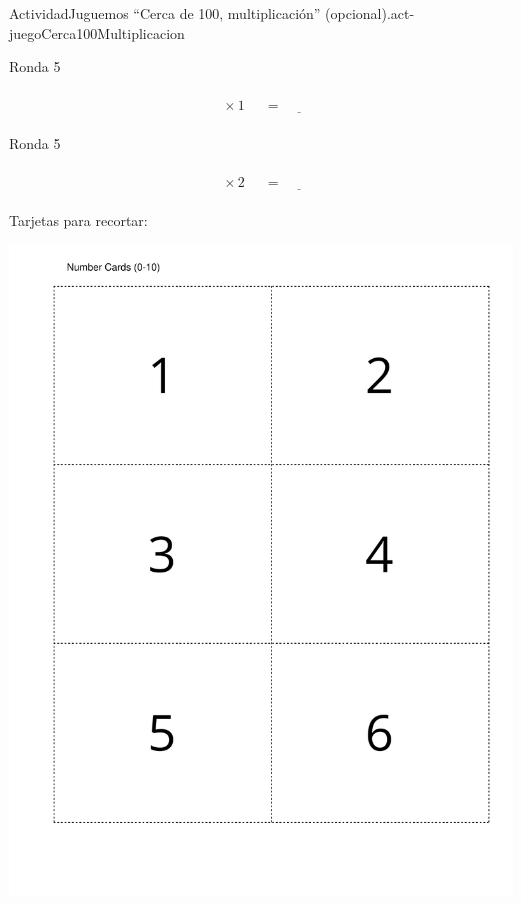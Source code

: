 \documentclass[14pt]{extarticle}
\begin{document}
\begin{activity}{Actividad}{Juguemos “Cerca de 100, multiplicación” (opcional).}{act-juegoCerca100Multiplicacion}
\begin{sidebyside}{2}{0}{0}{0.1}
\begin{sbspanel}{0.45}
%
\end{sbspanel}%
\end{sidebyside}%
\begin{sidebyside}{2}{0}{0}{0.1}%
\begin{sbspanel}{0.45}%
Ronda 5%
\par
%
\begin{equation*}
\boxed{\phantom{\frac{00}{00}}} \times 1 \ \boxed{\phantom{\frac{00}{00}}}= \underline{\hspace{1cm}}
\end{equation*}
%
\end{sbspanel}%
\begin{sbspanel}{0.45}%
Ronda 5%
\par
%
\begin{equation*}
\boxed{\phantom{\frac{00}{00}}} \times 2 \ \boxed{\phantom{\frac{00}{00}}}= \underline{\hspace{1cm}}
\end{equation*}
%
\end{sbspanel}%
\end{sidebyside}%
\end{activity}
\clearpage
Tarjetas para recortar:
\begin{image}{0}{1}{0}{}%
\includegraphics[page=1, rotate=90, scale=0.55, trim=40 40 20 40, clip, center] {external/blm/pdf-source/tarjetasDeDigitos.pdf}
\end{image}%
\end{document}
